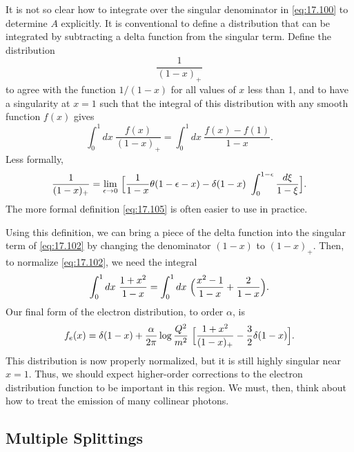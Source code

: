 It is not so clear how to integrate over the singular denominator in
\eqref{eq:17.100} to determine $A$ explicitly.  It is conventional to define a
distribution that can be integrated by subtracting a delta function from the
singular term.  Define the distribution
\begin{equation}
  \frac{1}{(1-x)_+}
  \label{eq:17.104}
\end{equation}
to agree with the function $1/(1-x)$ for all values of $x$ less than 1, and
to have a singularity at $x = 1$ such that the integral of this distribution
with any smooth function $f(x)$ gives
\begin{equation}
  \int_0^1 dx\ \frac{f(x)}{(1-x)_+} = \int_0^1 dx\ \frac{f(x) - f(1)}
    {1-x} .
  \label{eq:17.105}
\end{equation}
Less formally,
\begin{equation}
  \frac{1}{(1-x)_+} = \lim_{\epsilon\to 0}\ \Bigl[ \frac{1}{1-x}
    \theta(1-\epsilon-x) - \delta(1-x)\ \int_0^{1-\epsilon} \frac{d\xi}{1-\xi}
    \Bigr] .
  \label{eq:17.106}
\end{equation}
The more formal definition \eqref{eq:17.105} is often easier to use in
practice.

Using this definition, we can bring a piece of the delta function into the
singular term of \eqref{eq:17.102} by changing the denominator $(1-x)$ to
$(1-x)_+$.  Then, to normalize \eqref{eq:17.102}, we need the integral
\begin{equation}
  \int_0^1 dx\ \frac{1+x^2}{1-x} = \int_0^1 dx\ \Bigl( \frac{x^2-1}{1-x}
    + \frac{2}{1-x} \Bigr) .
\end{equation}
Our final form of the electron distribution, to order $\alpha$, is
\begin{equation}
  f_e(x) = \delta(1-x) + \frac{\alpha}{2\pi}\log\frac{Q^2}{m^2}\ \Bigl[
    \frac{1+x^2}{(1-x)_+} - \frac{3}{2}\delta(1-x) \Bigr] .
  \label{eq:17.107}
\end{equation}
This distribution is now properly normalized, but it is still highly singular
near $x = 1$.  Thus, we should expect higher-order corrections to the
electron distribution function to be important in this region.  We must,
then, think about how to treat the emission of many collinear photons.

\subsection{Multiple Splittings}

